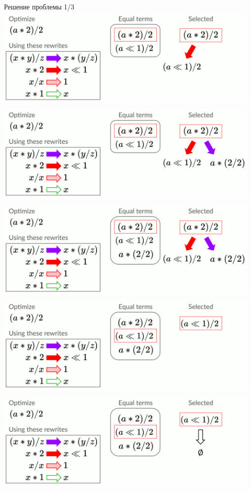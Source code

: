 \documentclass[aspectratio=169
  , xcolor={svgnames}
  , russian  %
  ]{beamer}
\begin{document}
\begin{frame}{Решение проблемы 1/3}
{   }
    {
        \centering
        \includegraphics[width=13cm, height=5cm]{misc/egraphs_images/naive/n-3.jpg}
   }
    {
        \centering
        \includegraphics[width=13cm, height=5cm]{misc/egraphs_images/naive/n-4.jpg}
   }
    {
        \centering
        \includegraphics[width=13cm, height=5cm]{misc/egraphs_images/naive/n-5.jpg}
   }
    {
        \centering
        \includegraphics[width=13cm, height=5cm]{misc/egraphs_images/naive/n-6.jpg}
   }
    {
        \centering
        \includegraphics[width=13cm, height=5cm]{misc/egraphs_images/naive/n-7.jpg}
}
\end{frame}
\end{document}
